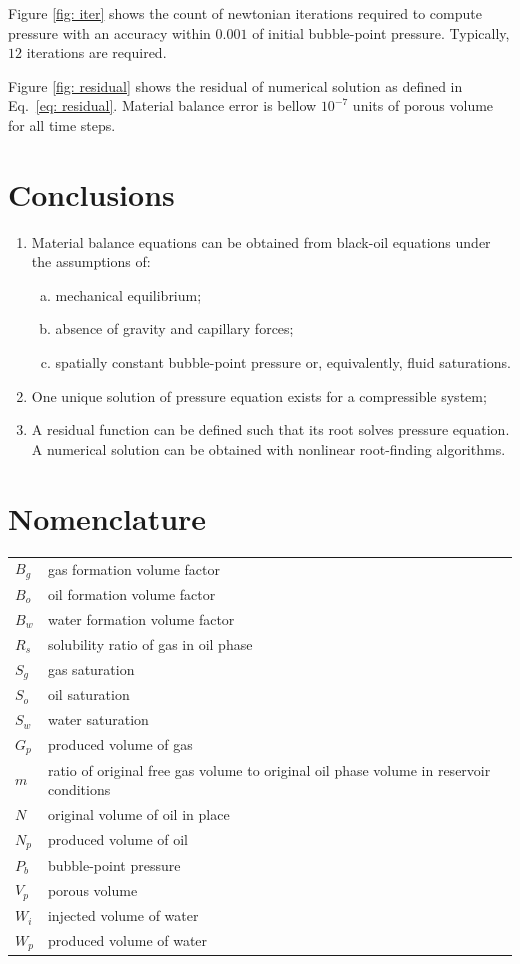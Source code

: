 \documentclass[authoryear,preprint,review,12pt]{elsarticle}
\begin{document}
Figure \ref{fig: iter} shows the count of newtonian iterations required to compute pressure with an accuracy within $0.001$ of initial bubble-point pressure. Typically, $12$ iterations are required.

Figure \ref{fig: residual} shows the residual of numerical solution as defined in Eq.~\eqref{eq: residual}. Material balance error is bellow $10^{-7}$ units of porous volume for all time steps.



\section{Conclusions}
\begin{enumerate}[1.]
\item Material balance equations can be obtained from black-oil equations under the assumptions of:
\begin{enumerate}[(a)]
\item mechanical equilibrium;
\item absence of gravity and capillary forces;
\item spatially constant bubble-point pressure or, equivalently, fluid saturations.
\end{enumerate}
\item One unique solution of pressure equation exists for a compressible system;
\item A residual function can be defined such that its root solves pressure equation. A numerical solution can be obtained with nonlinear root-finding algorithms.
\end{enumerate}

\section*{Nomenclature}
\begin{tabular}{ll}
$B_g$ & gas formation volume factor\\
$B_o$ & oil formation volume factor\\
$B_w$ & water formation volume factor\\
$R_s$ & solubility ratio of gas in oil phase\\
$S_g$ & gas saturation \\
$S_o$ & oil saturation \\
$S_w$ & water saturation \\
$G_p$ & produced volume of gas \\
$m$ & ratio of original free gas volume to original oil phase volume in reservoir conditions \\
$N$ & original volume of oil in place \\
$N_p$ & produced volume of oil \\
$P_b$ & bubble-point pressure \\
$V_p$ & porous volume \\
$W_i$ & injected volume of water \\
$W_p$ & produced volume of water
\end{tabular}
\end{document}
